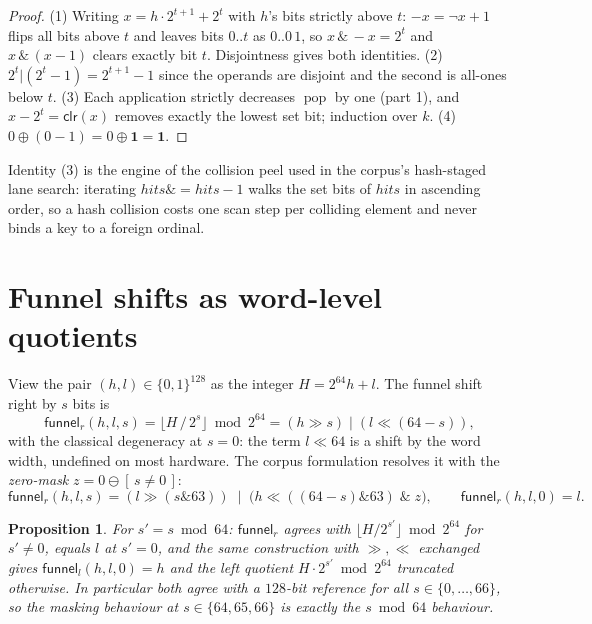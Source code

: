 \documentclass[11pt,a4paper]{report}
\newtheorem{proposition}[theorem]{Proposition}
\newcommand{\ones}{\mathbf{1}}
\newcommand{\sel}[1]{\left[\,#1\,\right]}
\DeclareMathOperator{\pop}{pop}
\begin{document}
\begin{proof}
(1) Writing $x = h \cdot 2^{t+1} + 2^{t}$ with $h$'s bits strictly above
$t$: $-x = \lnot x + 1$ flips all bits above $t$ and leaves bits
$0..t$ as $0..0\,1$, so $x \,\&\, -x = 2^t$ and $x \,\&\, (x-1)$ clears
exactly bit $t$. Disjointness gives both identities.
(2) $2^t | (2^t - 1) = 2^{t+1} - 1$ since the operands are disjoint and
the second is all-ones below $t$.
(3) Each application strictly decreases $\pop$ by one (part 1), and
$x - 2^t = \mathsf{clr}(x)$ removes exactly the lowest set bit; induction
over $k$.
(4) $0 \oplus (0-1) = 0 \oplus \ones = \ones$.
\end{proof}

Identity (3) is the engine of the collision peel used in the corpus's
hash-staged lane search: iterating
$\mathit{hits} \mathrel{\&}= \mathit{hits} - 1$ walks the set bits of
$\mathit{hits}$ in ascending order, so a hash collision costs one scan
step per colliding element and never binds a key to a foreign ordinal.

\section{Funnel shifts as word-level quotients}

View the pair $(h, l) \in \{0,1\}^{128}$ as the integer
$H = 2^{64} h + l$. The funnel shift right by $s$ bits is
\begin{equation}
\mathsf{funnel}_r(h, l, s) = \big\lfloor H \,/\, 2^{s} \big\rfloor \bmod 2^{64}
= (h \gg s) \;|\; (l \ll (64 - s)),
\end{equation}
with the classical degeneracy at $s = 0$: the term $l \ll 64$ is a
shift by the word width, undefined on most hardware. The corpus
formulation resolves it with the \emph{zero-mask}
$z = 0 \ominus \sel{s \neq 0}$:
\begin{equation}
\mathsf{funnel}_r(h, l, s) = (l \gg (s \& 63)) \;\;|\;\;
\bigl(h \ll ((64 - s) \& 63) \;\&\; z\bigr),
\qquad \mathsf{funnel}_r(h, l, 0) = l .
\end{equation}

\begin{proposition}\label{prop:funnel}
For $s' = s \bmod 64$: $\mathsf{funnel}_r$ agrees with
$\lfloor H/2^{s'}\rfloor \bmod 2^{64}$ for $s' \neq 0$, equals $l$ at
$s'=0$, and the same construction with $\gg,\ll$ exchanged gives
$\mathsf{funnel}_l(h,l,0) = h$ and the left quotient
$H \cdot 2^{s'} \bmod 2^{64}$ truncated otherwise. In particular both
agree with a $128$-bit reference for all $s \in \{0,\dots,66\}$,
so the masking behaviour at $s \in \{64, 65, 66\}$ is exactly the
$s \bmod 64$ behaviour.
\end{proposition}
\end{document}
